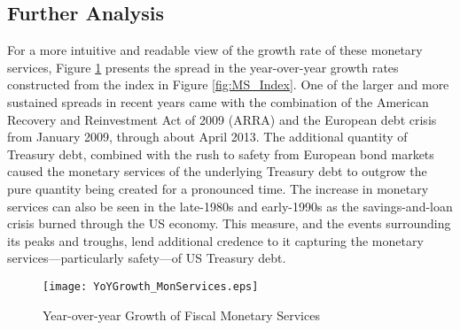 \documentclass[11pt,a4paper,margin=1.5in]{article}
\begin{document}
\subsection{Further Analysis}
For a more intuitive and readable view of the growth rate of these monetary services, Figure \ref{fig:YoY_growth} presents the spread in the year-over-year growth rates constructed from the index in Figure \ref{fig:MS_Index}.
One of the larger and more sustained spreads in recent years came with the combination of the American Recovery and Reinvestment Act of 2009 (ARRA) and the European debt crisis from January 2009, through about April 2013. 
The additional quantity of Treasury debt, combined with the rush to safety from European bond markets caused the monetary services of the underlying Treasury debt to outgrow the pure quantity being created for a pronounced time.
The increase in monetary services can also be seen in the late-1980s and early-1990s as the savings-and-loan crisis burned through the US economy.
This measure, and the events surrounding its peaks and troughs, lend additional credence to it capturing the monetary services---particularly safety---of US Treasury debt. 
\begin{figure}[h]
\centering
\texttt{[image: YoYGrowth\_MonServices.eps]}
\caption{Year-over-year Growth of Fiscal Monetary Services}
\label{fig:YoY_growth}
\end{figure}
%
\end{document}
